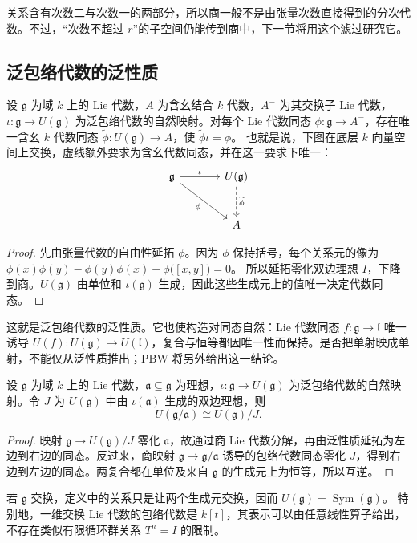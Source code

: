 关系含有次数二与次数一的两部分，所以商一般不是由张量次数直接得到的分次代数。不过，“次数不超过 \(r\)”的子空间仍能传到商中，下一节将用这个滤过研究它。

\subsection{泛包络代数的泛性质}
\label{b5:subsec:1501:02}

\begin{theorem}\label{b5:thm:enveloping-universal}
	设 \(\mathfrak g\) 为域 \(k\) 上的 Lie 代数，\(A\) 为含幺结合 \(k\) 代数，\(A^{-}\) 为其交换子 Lie 代数，\(\iota:\mathfrak g\to U(\mathfrak g)\) 为泛包络代数的自然映射。对每个 Lie 代数同态 \(\phi:\mathfrak g\to A^{-}\)，存在唯一含幺 \(k\) 代数同态 \(\widetilde\phi:U(\mathfrak g)\to A\)，使 \(\widetilde\phi\iota=\phi\)。 也就是说，下图在底层 \(k\) 向量空间上交换，虚线额外要求为含幺代数同态，并在这一要求下唯一：
	\[
		\begin{tikzcd}[column sep=large,row sep=large]
			\mathfrak g\arrow[r,"\iota"]\arrow[dr,"\phi"'] &U(\mathfrak g)\arrow[d,dashed,"\widetilde\phi"]\\
			&A
		\end{tikzcd}
	\]
\end{theorem}
\begin{proof}
	先由张量代数的自由性延拓 \(\phi\)。因为 \(\phi\) 保持括号，每个关系元的像为 \(\phi(x)\phi(y)-\phi(y)\phi(x)-\phi\bigl([x,y]\bigr)=0\)。 所以延拓零化双边理想 \(I\)，下降到商。\(U(\mathfrak g)\) 由单位和 \(\iota(\mathfrak g)\) 生成，因此这些生成元上的值唯一决定代数同态。
\end{proof}
这就是泛包络代数的泛性质。它也使构造对同态自然：Lie 代数同态 \(f:\mathfrak g\to\mathfrak l\) 唯一诱导 \(U(f):U(\mathfrak g)\to U(\mathfrak l)\)，复合与恒等都因唯一性而保持。是否把单射映成单射，不能仅从泛性质推出；PBW 将另外给出这一结论。
\begin{proposition}\label{b5:prop:enveloping-quotient}
	设 \(\mathfrak g\) 为域 \(k\) 上的 Lie 代数，\(\mathfrak a\subseteq\mathfrak g\) 为理想，\(\iota:\mathfrak g\to U(\mathfrak g)\) 为泛包络代数的自然映射。令 \(J\) 为 \(U(\mathfrak g)\) 中由 \(\iota(\mathfrak a)\) 生成的双边理想，则
	\[
		U(\mathfrak g/\mathfrak a)\cong U(\mathfrak g)/J.
	\]
\end{proposition}
\begin{proof}
	映射 \(\mathfrak g\to U(\mathfrak g)/J\) 零化 \(\mathfrak a\)，故通过商 Lie 代数分解，再由泛性质延拓为左边到右边的同态。反过来，商映射 \(\mathfrak g\to\mathfrak g/\mathfrak a\) 诱导的包络代数同态零化 \(J\)，得到右边到左边的同态。两复合都在单位及来自 \(\mathfrak g\) 的生成元上为恒等，所以互逆。
\end{proof}
若 \(\mathfrak g\) 交换，定义中的关系只是让两个生成元交换，因而 \(U(\mathfrak g)=\operatorname{Sym}(\mathfrak g)\)。 特别地，一维交换 Lie 代数的包络代数是 \(k[t]\)，其表示可以由任意线性算子给出，不存在类似有限循环群关系 \(T^n=I\) 的限制。


